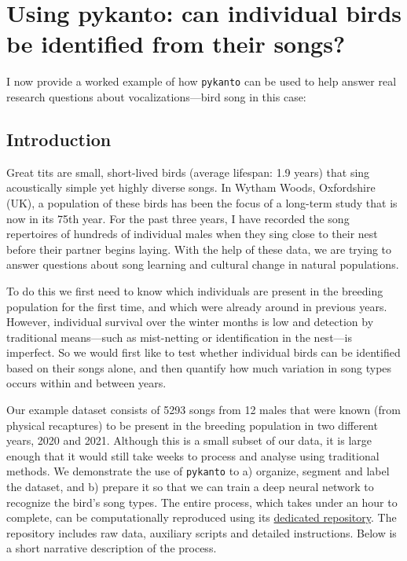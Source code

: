 \section{Using pykanto: can individual birds be identified from their songs?}

I now provide a worked example of how \texttt{pykanto} can be used to help answer real research questions about vocalizations---bird song in this case:

\subsection{Introduction}

Great tits are small, short-lived birds (average lifespan: 1.9 years) that sing
acoustically simple yet highly diverse songs. In Wytham Woods, Oxfordshire (UK),
a population of these birds has been the focus of a long-term study that is now
in its 75th year. For the past three years, I have recorded the song repertoires of
hundreds of individual males when they sing close to their nest before their
partner begins laying. With the help of these data, we are trying to answer
questions about song learning and cultural change in natural populations.

To do this we first need to know which individuals are present in the breeding
population for the first time, and which were already around in previous years.
However, individual survival over the winter months is low and detection by
traditional means---such as mist-netting or identification in the nest---is
imperfect. So we would first like to test whether individual birds can be
identified based on their songs alone, and then quantify how much variation in
song types occurs within and between years.

Our example dataset consists of 5293 songs from 12 males that were known (from
physical recaptures) to be present in the breeding population in two different
years, 2020 and 2021. Although this is a small subset of our data, it is large
enough that it would still take weeks to process and analyse using traditional
methods. We demonstrate the use of \texttt{pykanto} to a) organize, segment and label the
dataset, and b) prepare it so that we can train a deep neural network to
recognize the bird's song types. The entire process, which takes under an hour to complete,
can be computationally reproduced using its
\href{https://github.com/nilomr/pykanto-example}{dedicated
repository}. The repository includes
raw data, auxiliary scripts and detailed instructions. Below is a short
narrative description of the process.

